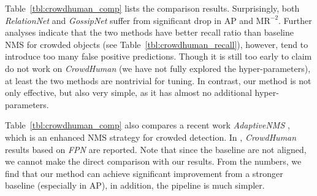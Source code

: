 \documentclass[10pt,twocolumn,letterpaper]{article}
\begin{document}
Table~\ref{tbl:crowdhuman_comp} lists the comparison results. Surprisingly, both \emph{RelationNet} and \emph{GossipNet} suffer from significant drop in AP and $\text{MR}^{-2}$. Further analyses indicate that the two methods have better recall ratio than baseline NMS for crowded objects (see Table~\ref{tbl:crowdhuman_recall}), however, tend to introduce too many false positive predictions. Though it is still too early to claim \cite{hu2017relation,learningnms} do not work on \emph{CrowdHuman} (we have not fully explored the hyper-parameters), at least the two methods are nontrivial for tuning. In contrast, our method is not only effective, but also very simple, as it has almost no additional hyper-parameters. 

Table~\ref{tbl:crowdhuman_comp} also compares a recent work \emph{AdaptiveNMS} \cite{adaptiveNMS}, which is an enhanced NMS strategy for crowded detection. In \cite{adaptiveNMS}, \emph{CrowdHuman} results based on \emph{FPN} are reported. Note that since the baseline are not aligned, we cannot make the direct comparison with our results. From the numbers, we find that our method can achieve significant improvement from a stronger baseline (especially in AP), in addition, the pipeline is much simpler. 
\end{document}
